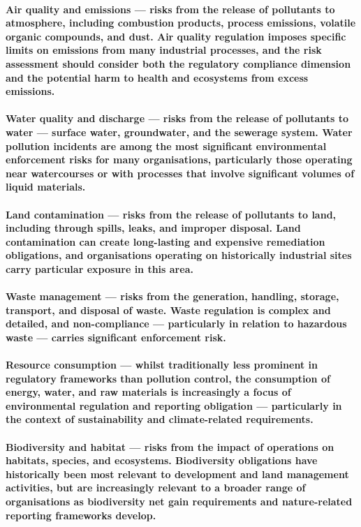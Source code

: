 \paragraph{\textbf{Air quality and emissions} — risks from the release of pollutants to atmosphere, including combustion products, process emissions, volatile organic compounds, and dust. Air quality regulation imposes specific limits on emissions from many industrial processes, and the risk assessment should consider both the regulatory compliance dimension and the potential harm to health and ecosystems from excess emissions.}
\paragraph{\textbf{Water quality and discharge} — risks from the release of pollutants to water — surface water, groundwater, and the sewerage system. Water pollution incidents are among the most significant environmental enforcement risks for many organisations, particularly those operating near watercourses or with processes that involve significant volumes of liquid materials.}
\paragraph{\textbf{Land contamination} — risks from the release of pollutants to land, including through spills, leaks, and improper disposal. Land contamination can create long-lasting and expensive remediation obligations, and organisations operating on historically industrial sites carry particular exposure in this area.}
\paragraph{\textbf{Waste management} — risks from the generation, handling, storage, transport, and disposal of waste. Waste regulation is complex and detailed, and non-compliance — particularly in relation to hazardous waste — carries significant enforcement risk.}
\paragraph{\textbf{Resource consumption} — whilst traditionally less prominent in regulatory frameworks than pollution control, the consumption of energy, water, and raw materials is increasingly a focus of environmental regulation and reporting obligation — particularly in the context of sustainability and climate-related requirements.}
\paragraph{\textbf{Biodiversity and habitat} — risks from the impact of operations on habitats, species, and ecosystems. Biodiversity obligations have historically been most relevant to development and land management activities, but are increasingly relevant to a broader range of organisations as biodiversity net gain requirements and nature-related reporting frameworks develop.}

